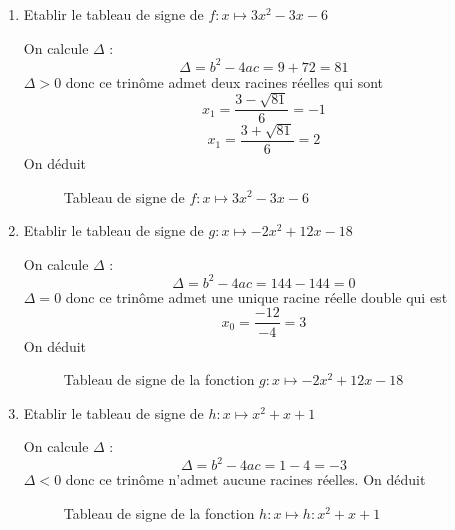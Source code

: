 \begin{exemples}
\begin{enumerate}
\item Etablir le tableau de signe de $f:x\mapsto 3x^2-3x-6$\newline

On calcule $\Delta$ : 
$$\Delta = b^2-4ac = 9+72 = 81$$
$\Delta > 0$ donc ce trinôme admet deux racines réelles qui sont 
$$x_1 = \dfrac{3-\sqrt{81}}{6} = -1$$
$$x_1 = \dfrac{3+\sqrt{81}}{6} = 2$$
On déduit \newline

\begin{figure}[H]
\centering
{}
\caption{Tableau de signe de $f:x\mapsto 3x^2-3x-6$}
\end{figure}
\item Etablir le tableau de signe de $g:x\mapsto -2x^2+12x-18$\newline

On calcule $\Delta$ : 
$$\Delta = b^2-4ac = 144-144 = 0$$
$\Delta = 0$ donc ce trinôme admet une unique racine réelle double qui est 
$$x_0 = \dfrac{-12}{-4} = 3$$
On déduit \newline

\begin{figure}[H]
\centering
{}
\caption{Tableau de signe de la fonction $g:x\mapsto -2x^2+12x-18$}
\end{figure}
\item Etablir le tableau de signe de $h:x\mapsto x^2+x+1$\newline

On calcule $\Delta$ : 
$$\Delta = b^2-4ac = 1-4 = -3$$
$\Delta < 0$ donc ce trinôme n'admet aucune racines réelles.
On déduit \newline

\begin{figure}[H]
\centering
{}
\caption{Tableau de signe de la fonction $h:x\mapsto h:x^2+x+1$}
\end{figure}
\end{enumerate}
\end{exemples}
